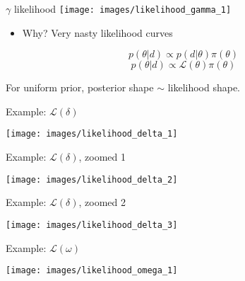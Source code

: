 \documentclass[10pt]{beamer}
\begin{document}
\begin{frame}{$\gamma$ likelihood}
	\texttt{[image: images/likelihood\_gamma\_1]}
\end{frame}


	\begin{frame}{}
	
	\begin{itemize}
		\item Why? Very nasty likelihood curves
	\end{itemize}
	
	
	$$  p(\theta | d) \propto p(d | \theta) \pi({\theta})$$
	$$ p(\theta | d) \propto \mathcal{L}(\theta) \pi({\theta})$$
	
		
	For uniform prior, posterior shape $\sim$ likelihood shape. 


\end{frame}



\begin{frame}{}
	
	Example: $\mathcal{L}(\delta)$
	
\texttt{[image: images/likelihood\_delta\_1]}
	
	
\end{frame}

\begin{frame}{}
	
	Example: $\mathcal{L}(\delta)$, zoomed 1
	
	\texttt{[image: images/likelihood\_delta\_2]}
	
	
\end{frame}


\begin{frame}{}
	
	Example: $\mathcal{L}(\delta)$, zoomed 2
	
	\texttt{[image: images/likelihood\_delta\_3]}
	
	
\end{frame}


\begin{frame}{}
	
	Example: $\mathcal{L}(\omega)$
	
	\texttt{[image: images/likelihood\_omega\_1]}

	
\end{frame}
\end{document}
